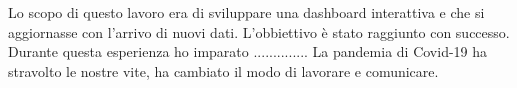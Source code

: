 \setlength{\parskip}{1em}

Lo scopo di questo lavoro era di sviluppare una dashboard interattiva e che si aggiornasse con l'arrivo di nuovi dati.
L'obbiettivo è stato raggiunto con successo.
Durante questa esperienza ho imparato ..............
La pandemia di Covid-19 ha stravolto le nostre vite, ha cambiato il modo di lavorare e comunicare.